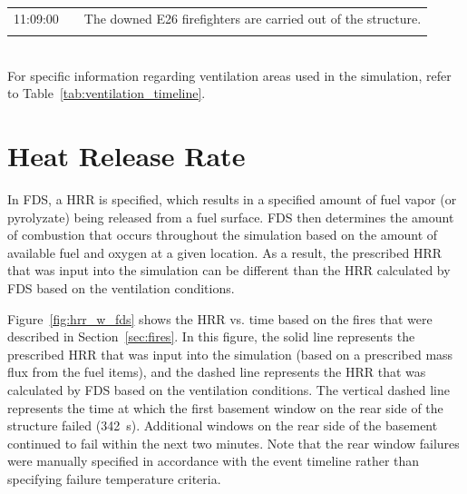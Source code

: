 \documentclass[12pt,oneside]{book}
\begin{document}
\begin{table}[!ht]
\begin{tabular}{ccl}
11:09:00       &              &  The downed E26 firefighters are carried out of the structure.       \\
               &              &                                                                      \\
\bottomrule
\end{tabular}
\footnotesize
\\ For specific information regarding ventilation areas used in the simulation, refer to Table~\ref{tab:ventilation_timeline}.
\normalsize
\label{tab:combined_timeline}
\end{table}


\clearpage


\section{Heat Release Rate}
\label{sec:HRR}

In FDS, a HRR is specified, which results in a specified amount of fuel vapor (or pyrolyzate) being released from a fuel surface. FDS then determines the amount of combustion that occurs throughout the simulation based on the amount of available fuel and oxygen at a given location. As a result, the prescribed HRR that was input into the simulation can be different than the HRR calculated by FDS based on the ventilation conditions.

Figure~\ref{fig:hrr_w_fds} shows the HRR vs. time based on the fires that were described in Section~\ref{sec:fires}. In this figure, the solid line represents the prescribed HRR that was input into the simulation (based on a prescribed mass flux from the fuel items), and the dashed line represents the HRR that was calculated by FDS based on the ventilation conditions. The vertical dashed line represents the time at which the first basement window on the rear side of the structure failed (342~s). Additional windows on the rear side of the basement continued to fail within the next two minutes. Note that the rear window failures were manually specified in accordance with the event timeline rather than specifying failure temperature criteria.
\end{document}
